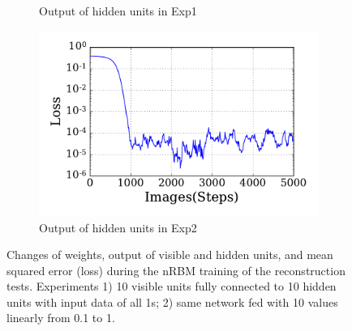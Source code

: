 \begin{figure}
\begin{subfigure}[t]{0.45\textwidth}
		\caption{Output of hidden units in Exp1}
	\end{subfigure}
	\begin{subfigure}[t]{0.45\textwidth}
		\includegraphics[width=\textwidth]{pics_sdlm/30_exp_RBM/exp2_loss.pdf}
		\caption{Output of hidden units in Exp2}
	\end{subfigure}
	\caption{Changes of weights, output of visible and hidden units, and mean squared error (loss) during the nRBM training of the reconstruction tests. 
		Experiments 1) 10 visible units fully connected to 10 hidden units with input data of all 1s; 2) \protect{} same network fed with 10 values \protect{} \protect{} linearly from 0.1 to 1.}
	\label{fig:rbm_orig}
\end{figure}

